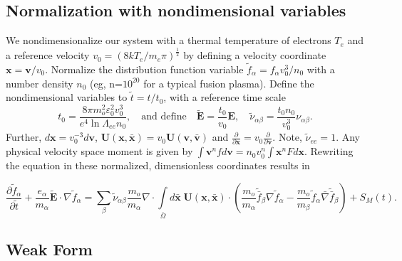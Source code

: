 \documentclass[12pt]{siamart}
\begin{document}
\subsection{Normalization with nondimensional variables}

We nondimensionalize our system with a  thermal temperature of electrons $T_e$ and a reference velocity $v_0 = \left ( 8kT_e/m_e\pi \right)^{\frac{1}{2}} $ by defining a velocity coordinate ${\bm x = \bm v / v_0}$.
Normalize the distribution function variable  $\tilde f_{\alpha} = f_{\alpha}v_0^3/n_0$ with a number density $n_0$ (eg, n=$10^{20}$ for a typical fusion plasma).
Define the nondimensional variables to $\tilde t = t/t_0$,  with a reference time scale 
\begin{equation}
\label{eq:ndvars}
t_0 = \frac{8\pi m_o^2\varepsilon_0^2v_0^3}{e^4\ln\Lambda_{ee}n_0}, \quad \text{and define} \quad
\tilde {\bm E} = \frac{ t_0}{v_0} {\bm E}, \quad
\tilde \nu_{\alpha\beta} = \frac{t_0n_0}{v_0^3} \nu_{\alpha\beta}.
\end{equation}
Further, $d\bm{{x}} = v_0^{-3} d\bm{{v}}$, $\mathbf{U}(\bm{x},\bm{\bar{x}}) = v_0\mathbf{U}(\bm{v},\bm{\bar{v}})$  and $\frac{\partial}{\partial \bm x} = v_0\frac{\partial}{\partial \bm v }$.
Note, $\tilde \nu_{ee}=1$.
Any physical velocity space moment is given by $\int \bm{v}^n fd\bm{v}=n_0v_0^{n}\int \bm{x}^nF d\bm{x}$. 
Rewriting the equation in these normalized, dimensionless coordinates results in

\begin{equation*}
\label{eq:landau2}
\frac{\partial \tilde f_{\alpha}}{\partial \tilde t}+  \frac{ e_\alpha}{m_{\alpha}} \tilde{\bm E} \cdot \nabla \tilde f_{\alpha} = 
\sum_{\beta} \tilde \nu_{\alpha\beta}\frac{m_o}{m_{\alpha}}\nabla \cdot\int \limits_{\bar\Omega} d\bm{\bar{x}}\;\mathbf{U}(\bm{x},\bm{\bar{x}})\cdot\left(\frac{m_o}{m_{\alpha}} \tilde {\bar{f}}_{\beta} \nabla \tilde f_{\alpha} - \frac{m_o}{m_{\beta}} \tilde f_{\alpha} {\bar  \nabla} \tilde {\bar {f}}_{\beta}\right)  + S_M\left(t\right).
\end{equation*}

\subsection{Weak Form}
\end{document}
